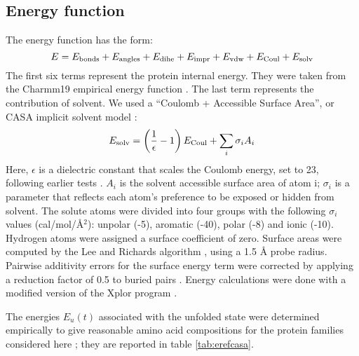 \subsection{Energy function}
The energy function has the form:
\begin{equation}
E = E_{\rm bonds} + E_{\rm angles} + E_{\rm dihe} + E_{\rm impr} + E_{\rm vdw} + E_{\rm Coul} + E_{\rm solv} 
\end{equation}
The first six terms represent the protein internal energy. They were taken from the Charmm19 empirical energy function \cite{Brooks09}. The last term represents the contribution of solvent. We used a ``Coulomb + Accessible Surface Area'', or CASA implicit solvent model \cite{Lopes07,Schmidt08b}:
\begin{equation} \label{eq:casa}
E_{\rm solv} = \left( \frac{1}{\epsilon} -1 \right) E_{\rm Coul} + \sum_i \sigma_i A_i
\end{equation}
Here, $\epsilon$ is a dielectric constant that scales the Coulomb energy, set to 23, following earlier tests \cite{Schmidt08b}. $A_i$ is the solvent accessible surface area of atom i; $\sigma_i$ is a parameter that reflects each atom's preference to be exposed or hidden from solvent. The solute atoms were divided into four groups with the following $\sigma_i$ values (cal/mol/\AA$^2$): unpolar (-5), aromatic (-40), polar (-8) and ionic (-10). Hydrogen atoms were assigned a surface coefficient of zero. Surface areas were computed by the Lee and Richards algorithm \cite{Lee71}, using a 1.5 {\AA} probe radius. Pairwise additivity errors for the surface energy term were corrected by applying a reduction factor of 0.5 to buried pairs \cite{Street98,Lopes07}. Energy calculations were done with a modified version of the Xplor program \cite{Xplor,Simonson13b}.

The energies $E_u(t)$ associated with the unfolded state were determined empirically to give reasonable amino acid compositions for the protein families considered here \cite{Schmidt08}; they are reported in table \ref{tab:erefcasa}.


